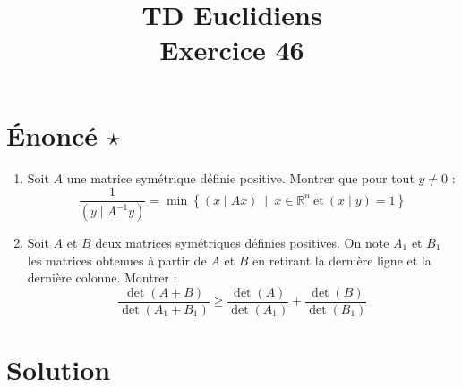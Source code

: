 \documentclass[french]{article}
\title{TD Euclidiens\\ Exercice 46}
\date{}
\newcommand{\R}{\mathbb{R}}
\newcommand{\inv}{^{-1}}
\begin{document}
\maketitle

\section{Énoncé $\star$}
\begin{enumerate}
	\item Soit $A$ une matrice symétrique définie positive. Montrer que pour tout $y\ne 0$ : $$\frac{1}{(y\mid A\inv y)}=\min\left\{(x\mid Ax)\ \mid\ x\in\R^n\ \text{et}\ (x\mid y)=1\right\}$$
	\item Soit $A$ et $B$ deux matrices symétriques définies positives. On note $A_1$ et $B_1$ les matrices obtenues à partir de $A$ et $B$ en retirant la dernière ligne et la dernière colonne. Montrer : $$\frac{\det(A+B)}{\det(A_1+B_1)}\geqslant\frac{\det(A)}{\det(A_1)}+\frac{\det(B)}{\det(B_1)}$$
\end{enumerate}
\section{Solution}
\end{document}
